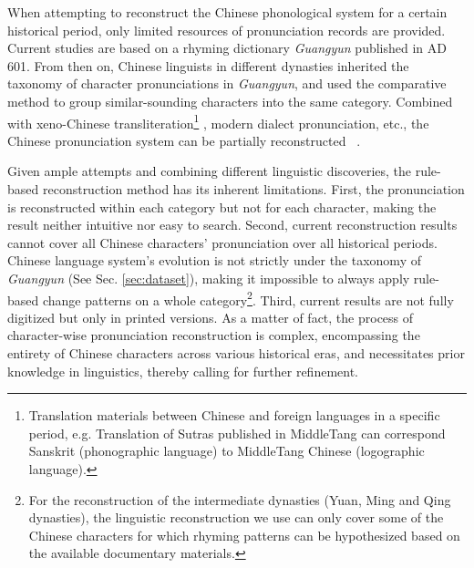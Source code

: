     When attempting to reconstruct the Chinese phonological system for a certain historical period, only limited resources of pronunciation records are provided. Current studies are based on a rhyming dictionary \textit{Guangyun} \cite{guangyun_1936} published in AD 601. From then on, Chinese linguists in different dynasties inherited the taxonomy of character pronunciations in \textit{Guangyun}, and used the comparative method to group similar-sounding characters into the same category. Combined with xeno-Chinese transliteration\footnote{Translation materials between Chinese and foreign languages in a specific period, e.g. Translation of Sutras published in MiddleTang can correspond Sanskrit (phonographic language) to MiddleTang Chinese (logographic language).}
    , modern dialect pronunciation, etc., the Chinese pronunciation system can be partially reconstructed ~\cite{zhao_hanyu_2015}. 

    Given ample attempts and combining different linguistic discoveries, the rule-based reconstruction method has its inherent limitations. 
    First, the pronunciation is reconstructed within each category but not for each character, making the result neither intuitive nor easy to search.
    Second, current reconstruction results cannot cover all Chinese characters' pronunciation over all historical periods. Chinese language system's evolution is not strictly under the taxonomy of \textit{Guangyun} (See Sec. \ref{sec:dataset}), making it impossible to always apply rule-based change patterns on a whole category\footnote{For the reconstruction of the intermediate dynasties (Yuan, Ming and Qing dynasties), the linguistic reconstruction we use can only cover some of the Chinese characters for which rhyming patterns can be hypothesized based on the available documentary materials.}. 
    Third, current results are not fully digitized but only in printed versions. 
    As a matter of fact, the process of character-wise pronunciation reconstruction is complex, encompassing the entirety of Chinese characters across various historical eras, and necessitates prior knowledge in linguistics, thereby calling for further refinement. 
    
